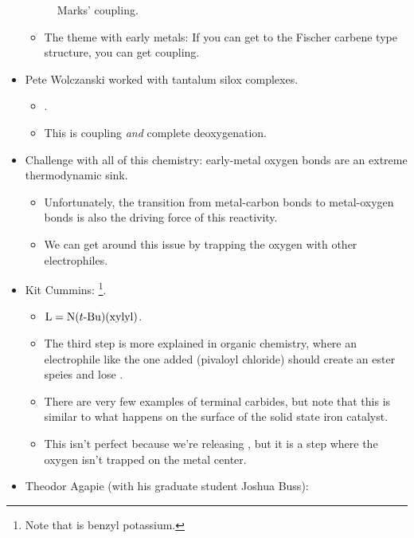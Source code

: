 \documentclass[../notes.tex]{subfiles}
\begin{document}
\begin{itemize}
\begin{figure}[h!]
        \caption{Marks'  coupling.}
        \label{fig:CCcoupling-Marks}
    \end{figure}
    \begin{itemize}
        \item The theme with early metals: If you can get to the Fischer carbene type structure, you can get coupling.
    \end{itemize}
    \item Pete Wolczanski worked with tantalum silox complexes.
    \begin{itemize}
        \item {}.
        \item This is  coupling \emph{and} complete deoxygenation.
    \end{itemize}
    \item Challenge with all of this chemistry: early-metal oxygen bonds are an extreme thermodynamic sink.
    \begin{itemize}
        \item Unfortunately, the transition from metal-carbon bonds to metal-oxygen bonds is also the driving force of this reactivity.
        \item We can get around this issue by trapping the oxygen with other electrophiles.
    \end{itemize}
    \item Kit Cummins: \footnote{Note that  is benzyl potassium.}.
    \begin{itemize}
        \item $\ce{L}=\ce{N($t${-}Bu)({xylyl})}$.
        \item The third step is more explained in organic chemistry, where an electrophile like the one added (pivaloyl chloride) should create an ester speies and lose .
        \item There are very few examples of terminal carbides, but note that this is similar to what happens on the surface of the solid state iron catalyst.
        \item This isn't perfect because we're releasing , but it is a step where the oxygen isn't trapped on the metal center.
    \end{itemize}
    \item Theodor Agapie (with his graduate student Joshua Buss):

\end{itemize}
\end{document}
